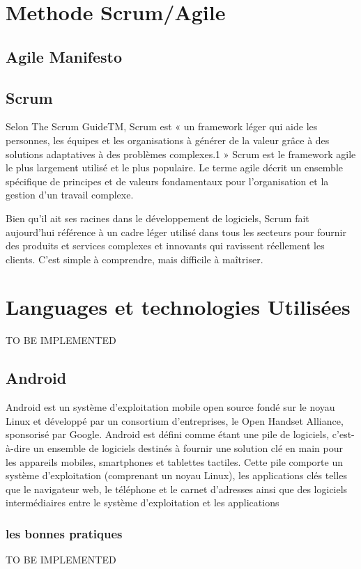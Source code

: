 \section{Methode Scrum/Agile}
\subsection{Agile Manifesto}

\subsection{Scrum}
Selon The Scrum GuideTM, Scrum est « un framework léger qui aide les personnes, les équipes et les organisations à générer de la valeur grâce à des solutions adaptatives à des problèmes complexes.1 » Scrum est le framework agile le plus largement utilisé et le plus populaire. Le terme agile décrit un ensemble spécifique de principes et de valeurs fondamentaux pour l'organisation et la gestion d'un travail complexe.

Bien qu'il ait ses racines dans le développement de logiciels, Scrum fait aujourd'hui référence à un cadre léger utilisé dans tous les secteurs pour fournir des produits et services complexes et innovants qui ravissent réellement les clients. C'est simple à comprendre, mais difficile à maîtriser.
\cite*{scrumalliance}
\section{Languages et technologies Utilisées}
TO BE IMPLEMENTED
\subsection{Android}
Android est un système d'exploitation mobile open source fondé sur le noyau Linux et développé par un consortium d'entreprises, le Open Handset Alliance, sponsorisé par Google. 
Android est défini comme étant une pile de logiciels, c'est-à-dire un ensemble de logiciels destinés à fournir une solution clé en main pour les appareils mobiles, smartphones et tablettes tactiles. Cette pile comporte un système d'exploitation (comprenant un noyau Linux), les applications clés telles que le navigateur web, le téléphone et le carnet d'adresses ainsi que des logiciels intermédiaires entre le système d'exploitation et les applications
\cite*{wiki:Android}
\subsubsection{les bonnes pratiques}
TO BE IMPLEMENTED
